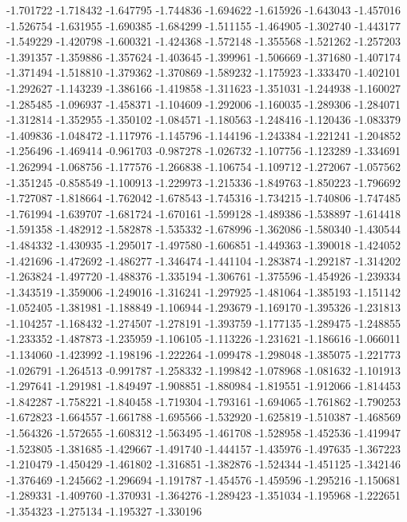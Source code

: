 -1.701722
-1.718432
-1.647795
-1.744836
-1.694622
-1.615926
-1.643043
-1.457016
-1.526754
-1.631955
-1.690385
-1.684299
-1.511155
-1.464905
-1.302740
-1.443177
-1.549229
-1.420798
-1.600321
-1.424368
-1.572148
-1.355568
-1.521262
-1.257203
-1.391357
-1.359886
-1.357624
-1.403645
-1.399961
-1.506669
-1.371680
-1.407174
-1.371494
-1.518810
-1.379362
-1.370869
-1.589232
-1.175923
-1.333470
-1.402101
-1.292627
-1.143239
-1.386166
-1.419858
-1.311623
-1.351031
-1.244938
-1.160027
-1.285485
-1.096937
-1.458371
-1.104609
-1.292006
-1.160035
-1.289306
-1.284071
-1.312814
-1.352955
-1.350102
-1.084571
-1.180563
-1.248416
-1.120436
-1.083379
-1.409836
-1.048472
-1.117976
-1.145796
-1.144196
-1.243384
-1.221241
-1.204852
-1.256496
-1.469414
-0.961703
-0.987278
-1.026732
-1.107756
-1.123289
-1.334691
-1.262994
-1.068756
-1.177576
-1.266838
-1.106754
-1.109712
-1.272067
-1.057562
-1.351245
-0.858549
-1.100913
-1.229973
-1.215336
-1.849763
-1.850223
-1.796692
-1.727087
-1.818664
-1.762042
-1.678543
-1.745316
-1.734215
-1.740806
-1.747485
-1.761994
-1.639707
-1.681724
-1.670161
-1.599128
-1.489386
-1.538897
-1.614418
-1.591358
-1.482912
-1.582878
-1.535332
-1.678996
-1.362086
-1.580340
-1.430544
-1.484332
-1.430935
-1.295017
-1.497580
-1.606851
-1.449363
-1.390018
-1.424052
-1.421696
-1.472692
-1.486277
-1.346474
-1.441104
-1.283874
-1.292187
-1.314202
-1.263824
-1.497720
-1.488376
-1.335194
-1.306761
-1.375596
-1.454926
-1.239334
-1.343519
-1.359006
-1.249016
-1.316241
-1.297925
-1.481064
-1.385193
-1.151142
-1.052405
-1.381981
-1.188849
-1.106944
-1.293679
-1.169170
-1.395326
-1.231813
-1.104257
-1.168432
-1.274507
-1.278191
-1.393759
-1.177135
-1.289475
-1.248855
-1.233352
-1.487873
-1.235959
-1.106105
-1.113226
-1.231621
-1.186616
-1.066011
-1.134060
-1.423992
-1.198196
-1.222264
-1.099478
-1.298048
-1.385075
-1.221773
-1.026791
-1.264513
-0.991787
-1.258332
-1.199842
-1.078968
-1.081632
-1.101913
-1.297641
-1.291981
-1.849497
-1.908851
-1.880984
-1.819551
-1.912066
-1.814453
-1.842287
-1.758221
-1.840458
-1.719304
-1.793161
-1.694065
-1.761862
-1.790253
-1.672823
-1.664557
-1.661788
-1.695566
-1.532920
-1.625819
-1.510387
-1.468569
-1.564326
-1.572655
-1.608312
-1.563495
-1.461708
-1.528958
-1.452536
-1.419947
-1.523805
-1.381685
-1.429667
-1.491740
-1.444157
-1.435976
-1.497635
-1.367223
-1.210479
-1.450429
-1.461802
-1.316851
-1.382876
-1.524344
-1.451125
-1.342146
-1.376469
-1.245662
-1.296694
-1.191787
-1.454576
-1.459596
-1.295216
-1.150681
-1.289331
-1.409760
-1.370931
-1.364276
-1.289423
-1.351034
-1.195968
-1.222651
-1.354323
-1.275134
-1.195327
-1.330196
